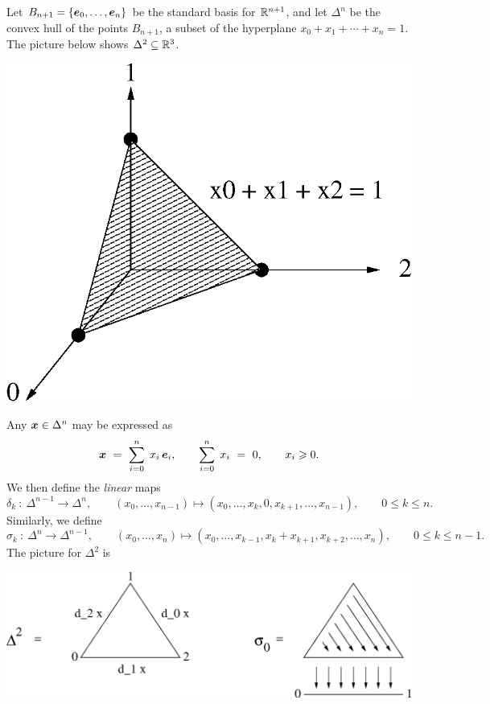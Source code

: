 Let $B_{n+1} = \{\boldsymbol{e}_0,\ldots,\boldsymbol{e}_n\}$ be the standard basis for 
$\mathbb{R}^{n+1}$, and let $\Delta^n$ be the convex hull of the points $B_{n+1}$, 
a subset of the hyperplane $x_0 + x_1 + \cdots + x_n = 1$. 
The picture below shows $\Delta^2 \subseteq \mathbb{R}^3$.
\begin{center}
\includegraphics[scale = 0.7]{simp-gps/n-simplex.eps}
\end{center}
Any $\boldsymbol{x} \in \Delta^n$ may be expressed as 
$$
\boldsymbol{x} ~=~ \sum_{i=0}^n\; x_i\,\boldsymbol{e}_i, \qquad 
\sum_{i=0}^n\;x_i ~=~ 0, \qquad x_i \geqslant 0.
$$
We then define the \emph{linear} maps 
$$
\delta_k ~:~ \Delta^{n-1} \to \Delta^n, \qquad 
(x_0,\ldots,x_{n-1}) \mapsto (x_0,\ldots,x_k,0,x_{k+1},\ldots,x_{n-1}), 
\qquad 0 \leqslant k \leqslant n. 
$$
Similarly, we define 
$$
\sigma_k ~:~ \Delta^n \to \Delta^{n-1}, \qquad 
(x_0,\ldots,x_n) \mapsto (x_0,\ldots,x_{k-1},x_k+x_{k+1},x_{k+2},\ldots,x_n), 
\qquad 0 \leqslant k \leqslant n-1. 
$$ 
The picture for $\Delta^2$ is 
\begin{center}
\includegraphics[scale = 0.7]{simp-gps/n-sigma.eps}
\end{center}


